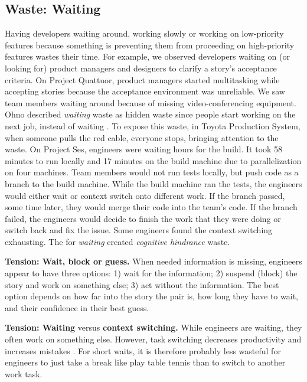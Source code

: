 \subsection{Waste: Waiting}
Having developers waiting around, working slowly or working on low-priority features because something is preventing them from proceeding on high-priority features wastes their time. For example, we observed developers waiting on (or looking for) product managers and designers to clarify a story's acceptance criteria. On Project Quattuor, product managers started multitasking while accepting stories because the acceptance environment was unreliable. We saw team members waiting around because of missing video-conferencing equipment. 
Ohno described \textit{waiting} waste as hidden waste since people start working on the next job, instead of waiting \cite{OhnoToyotaProductionSystem}. To expose this waste, in Toyota Production System, when someone pulls the red cable, everyone stops, bringing attention to the waste. On Project Ses, engineers were waiting hours for the build. It took 58 minutes to run locally and 17 minutes on the build machine due to parallelization on four machines. Team members would not run tests locally, but push code as a branch to the build machine. While the build machine ran the tests, the engineers would either wait or context switch onto different work. If the branch passed, some time later, they would merge their code into the team's code. If the branch failed, the engineers would decide to finish the work that they were doing or switch back and fix the issue. Some engineers found the context switching exhausting. The  for \textit{waiting} created \textit{cognitive hindrance} waste.

\textbf{Tension: Wait, block or guess.}
When needed information is missing, engineers appear to have three options: 1) wait for the information; 2) suspend (block) the story and work on something else; 3) act without the information. The best option depends on how far into the story the pair is, how long they have to wait, and their confidence in their best guess.

\textbf{Tension: Waiting} versus \textbf{context switching.}
While engineers are waiting, they often work on something else. However, task switching decreases productivity and increases mistakes \cite{MonsellTaskSwitching}. For short waits, it is therefore probably less wasteful for engineers to just take a break like play table tennis than to switch to another work task. 

